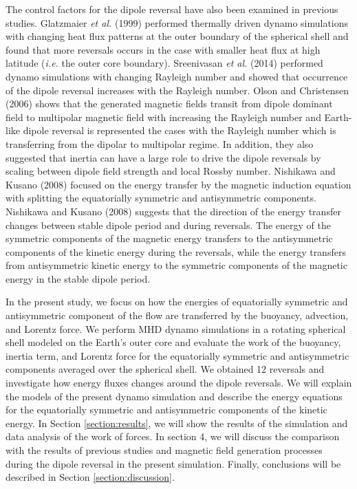 The control factors for the dipole reversal have also been %
{\color{red} examined in} previous studies. 
Glatzmaier {\it et al.} (1999) \cite{Glatzmaier:1999} performed thermally driven dynamo simulations with changing heat flux patterns at the outer boundary of the spherical shell and found that more reversals occurs in the case with smaller heat flux at high latitude ({\it i.e.} the outer core boundary). 
Sreenivasan {\it et al.} (2014) \cite{Sreenivasan:2014} performed dynamo simulations with changing Rayleigh number and showed that occurrence of the dipole reversal increases with the Rayleigh number. 
Olson and Christensen (2006) \cite{Olson:2006} shows that the generated magnetic fields transit from dipole dominant field to multipolar magnetic field with increasing the Rayleigh number and Earth-like dipole reversal is represented the cases with the Rayleigh number which is transferring from the dipolar to multipolar regime. 
In addition, they also suggested that inertia can have a large role to drive the dipole reversals by scaling between dipole field strength and local Rossby number. 
Nishikawa and Kusano (2008) \cite{Nishikawa:2008} focused on the energy transfer by the magnetic induction equation with splitting the equatorially symmetric and antisymmetric components. 
Nishikawa and Kusano (2008) suggests that the direction of the energy transfer changes between stable dipole period and during reversals. 
The energy of the symmetric components of the magnetic energy transfers to the antisymmetric components of the kinetic energy during the reversals, while the energy transfers from antisymmetric kinetic energy to the symmetric components of the magnetic energy in the stable dipole period.

In the present study, we focus on how the energies of equatorially symmetric and antisymmetric component of the flow are transferred by the buoyancy, advection, and Lorentz force. 
We perform MHD dynamo simulations in a rotating spherical shell modeled on the Earth's outer core and evaluate the work of the buoyancy, inertia term, and Lorentz force for the equatorially symmetric and antisymmetric components averaged over the spherical shell. 
We obtained 12 reversals and investigate how energy fluxes changes around the dipole reversals. We will explain the models of the present dynamo simulation and describe the energy equations for the equatorially symmetric and antisymmetric components of the kinetic energy. 
In Section \ref{section:results}, we will show the results of the simulation and data analysis of the work of forces. In section 4, we will discuss the comparison with the results of previous studies and magnetic field generation processes during the dipole reversal in the present simulation. 
Finally, conclusions will be described in Section \ref{section:discussion}.
